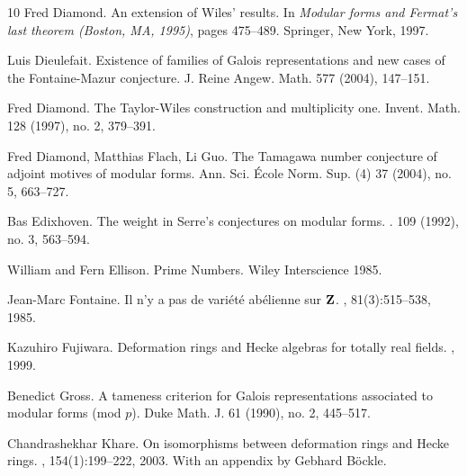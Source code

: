 \documentclass[12pt]{amsart}
\begin{document}
\begin{thebibliography}{10}
\bibitem{[D97]}
Fred Diamond.
\newblock An extension of {W}iles' results.
\newblock In {\em Modular forms and Fermat's last theorem (Boston, MA, 1995)},
  pages 475--489. Springer, New York, 1997.

Luis Dieulefait.
\newblock Existence of families of {G}alois representations and new cases of
  the {F}ontaine-{M}azur conjecture.
\newblock  J. Reine Angew. Math.  577  (2004), 147--151.

Fred Diamond.
\newblock The Taylor-Wiles construction and multiplicity one.  
\newblock Invent. Math.  128  (1997),  no. 2, 379--391.

 Fred Diamond,  Matthias Flach, Li Guo.
\newblock The Tamagawa number conjecture of adjoint motives of modular forms.  
\newblock Ann. Sci. \'Ecole Norm. Sup. (4)  37  (2004),  no. 5, 663--727.

Bas Edixhoven. 
\newblock The weight in Serre's conjectures on modular forms.
.  109  (1992),  no. 3, 563--594. 

William and Fern Ellison.
\newblock Prime Numbers.
\newblock Wiley Interscience 1985.

Jean-Marc Fontaine.
\newblock Il n'y a pas de vari\'et\'e ab\'elienne sur {${\bf Z}$}.
, 81(3):515--538, 1985.

Kazuhiro Fujiwara.
\newblock Deformation rings and {H}ecke algebras for totally real fields.
, 1999.

Benedict Gross.
\newblock A tameness criterion for Galois representations associated to modular forms (mod $p$).
\newblock Duke Math. J. 61 (1990), no. 2, 445--517.



\bibitem{[K03]}
Chandrashekhar Khare.
\newblock On isomorphisms between deformation rings and {H}ecke rings.
, 154(1):199--222, 2003.
\newblock With an appendix by Gebhard B\"ockle.



\end{thebibliography}
\end{document}
